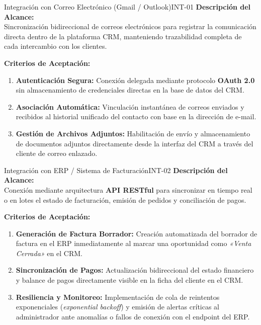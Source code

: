 \documentclass[11pt,a4paper]{article}
\begin{document}
\begin{IntegrationBox}{Integración con Correo Electrónico (Gmail / Outlook)}{INT-01}
    \sffamily
    \textbf{\textcolor{PrimaryNavy}{Descripción del Alcance:}}\\
    Sincronización bidireccional de correos electrónicos para registrar la comunicación directa dentro de la plataforma CRM, manteniendo trazabilidad completa de cada intercambio con los clientes.
    
    \vspace{0.2cm}
    \textbf{\textcolor{PrimaryNavy}{Criterios de Aceptación:}}
    \begin{enumerate}[label=\textbf{\arabic*.}]
        \item \textbf{Autenticación Segura:} Conexión delegada mediante protocolo \textbf{OAuth 2.0} sin almacenamiento de credenciales directas en la base de datos del CRM.
        \item \textbf{Asociación Automática:} Vinculación instantánea de correos enviados y recibidos al historial unificado del contacto con base en la dirección de e-mail.
        \item \textbf{Gestión de Archivos Adjuntos:} Habilitación de envío y almacenamiento de documentos adjuntos directamente desde la interfaz del CRM a través del cliente de correo enlazado.
    \end{enumerate}
\end{IntegrationBox}

\begin{IntegrationBox}{Integración con ERP / Sistema de Facturación}{INT-02}
    \sffamily
    \textbf{\textcolor{PrimaryNavy}{Descripción del Alcance:}}\\
    Conexión mediante arquitectura \textbf{API RESTful} para sincronizar en tiempo real o en lotes el estado de facturación, emisión de pedidos y conciliación de pagos.
    
    \vspace{0.2cm}
    \textbf{\textcolor{PrimaryNavy}{Criterios de Aceptación:}}
    \begin{enumerate}[label=\textbf{\arabic*.}]
        \item \textbf{Generación de Factura Borrador:} Creación automatizada del borrador de factura en el ERP inmediatamente al marcar una oportunidad como \textit{«Venta Cerrada»} en el CRM.
        \item \textbf{Sincronización de Pagos:} Actualización bidireccional del estado financiero y balance de pagos directamente visible en la ficha del cliente en el CRM.
        \item \textbf{Resiliencia y Monitoreo:} Implementación de cola de reintentos exponenciales (\textit{exponential backoff}) y emisión de alertas críticas al administrador ante anomalías o fallos de conexión con el endpoint del ERP.
    \end{enumerate}
\end{IntegrationBox}
\end{document}
